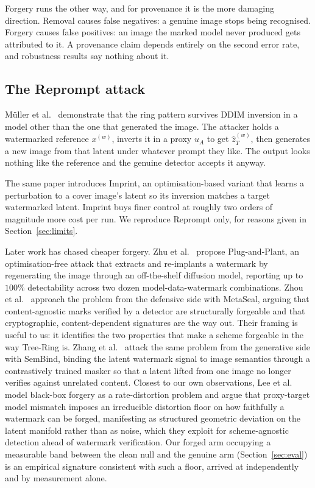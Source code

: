 \documentclass[10pt,twocolumn]{article}
\begin{document}
Forgery runs the other way, and for provenance it is the more damaging direction.
Removal causes false negatives: a genuine image stops being recognised. Forgery causes
false positives: an image the marked model never produced gets attributed to it. A
provenance claim depends entirely on the second error rate, and robustness results say
nothing about it.

\subsection{The Reprompt attack}

M\"uller et al.~\cite{muller2025semantic} demonstrate that the ring pattern survives
DDIM inversion in a model other than the one that generated the image. The attacker
holds a watermarked reference $x^{(w)}$, inverts it in a proxy $u_A$ to get
$\hat{z}_T^{(w)}$, then generates a new image from that latent under whatever prompt
they like. The output looks nothing like the reference and the genuine detector
accepts it anyway.

The same paper introduces Imprint, an optimisation-based variant that learns a
perturbation to a cover image's latent so its inversion matches a target watermarked
latent. Imprint buys finer control at roughly two orders of magnitude more cost per
run. We reproduce Reprompt only, for reasons given in Section~\ref{sec:limits}.

Later work has chased cheaper forgery. Zhu et al.~\cite{zhu2025optfree} propose
Plug-and-Plant, an optimisation-free attack that extracts and re-implants a watermark
by regenerating the image through an off-the-shelf diffusion model, reporting up to
$100\%$ detectability across two dozen model-data-watermark combinations. Zhou et
al.~\cite{zhou2026metaseal} approach the problem from the defensive side with
MetaSeal, arguing that content-agnostic marks verified by a detector are structurally
forgeable and that cryptographic, content-dependent signatures are the way out. Their
framing is useful to us: it identifies the two properties that make a scheme
forgeable in the way Tree-Ring is. Zhang et al.~\cite{zhang2026sembind} attack the same problem
from the generative side with SemBind, binding the latent watermark signal to image
semantics through a contrastively trained masker so that a latent lifted from one
image no longer verifies against unrelated content. Closest to our own observations,
Lee et al.~\cite{lee2026geometric} model black-box forgery as a rate-distortion problem and
argue that proxy-target model mismatch imposes an irreducible distortion floor on how
faithfully a watermark can be forged, manifesting as structured geometric deviation
on the latent manifold rather than as noise, which they exploit for scheme-agnostic
detection ahead of watermark verification. Our forged arm occupying a measurable band
between the clean null and the genuine arm (Section~\ref{sec:eval}) is an empirical
signature consistent with such a floor, arrived at independently and by measurement alone.
\end{document}
